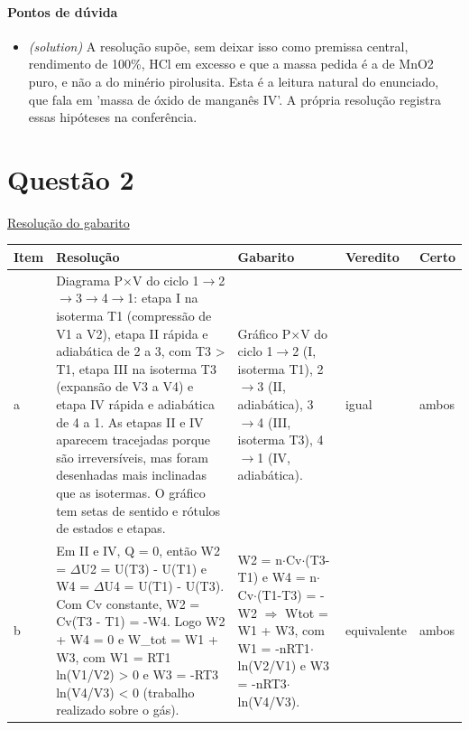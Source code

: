 \documentclass{article}%
\begin{document}
\paragraph{Pontos de dúvida}%
\begin{itemize}%
\item%
\textit{(solution)} A resolução supõe, sem deixar isso como premissa central, rendimento de 100\%, HCl em excesso e que a massa pedida é a de MnO2 puro, e não a do minério pirolusita. Esta é a leitura natural do enunciado, que fala em 'massa de óxido de manganês IV'. A própria resolução registra essas hipóteses na conferência.%
\end{itemize}%
\section*{Questão 2}%
\href{https://poliedroresolve.sistemapoliedro.com.br/vestibulares/ime/2027/ime-2-fase-dia-3-28-10-2026-2-fase-dia-3/dissertativa-2-quimica-2-fase-dia-3-ime-2027}{Resolução do gabarito}\par\smallskip%
\begin{longtable}{@{}p{} p{} p{} p{} p{}@{}}\toprule Item & Resolução & Gabarito & Veredito & Certo \\ \midrule
a & Diagrama P$\times$V do ciclo 1$\to$2$\to$3$\to$4$\to$1: etapa I na isoterma T1 (compressão de V1 a V2), etapa II rápida e adiabática de 2 a 3, com T3 > T1, etapa III na isoterma T3 (expansão de V3 a V4) e etapa IV rápida e adiabática de 4 a 1. As etapas II e IV aparecem tracejadas porque são irreversíveis, mas foram desenhadas mais inclinadas que as isotermas. O gráfico tem setas de sentido e rótulos de estados e etapas. & Gráfico P$\times$V do ciclo 1$\to$2 (I, isoterma T1), 2$\to$3 (II, adiabática), 3$\to$4 (III, isoterma T3), 4$\to$1 (IV, adiabática). & igual & ambos \\
b & Em II e IV, Q = 0, então W2 = $\Delta$U2 = U(T3) - U(T1) e W4 = $\Delta$U4 = U(T1) - U(T3). Com Cv constante, W2 = Cv(T3 - T1) = -W4. Logo W2 + W4 = 0 e W\_tot = W1 + W3, com W1 = RT1 ln(V1/V2) > 0 e W3 = -RT3 ln(V4/V3) < 0 (trabalho realizado sobre o gás). & W2 = n$\cdot$Cv$\cdot$(T3-T1) e W4 = n$\cdot$Cv$\cdot$(T1-T3) = -W2 $\Rightarrow$ Wtot = W1 + W3, com W1 = -nRT1$\cdot$ln(V2/V1) e W3 = -nRT3$\cdot$ln(V4/V3). & equivalente & ambos \\
\bottomrule\end{longtable}%
\end{document}
